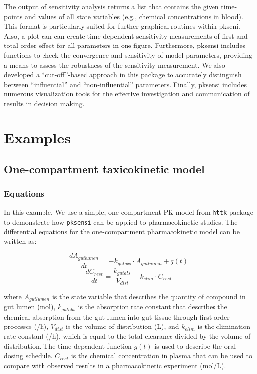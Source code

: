 \documentclass[article]{jss}
\begin{document}
The output of sensitivity analysis returns a list that contains the
given time-points and values of all state variables (e.g., chemical
concentrations in blood). This format is particularly suited for further
graphical routines within pkseni. Also, a plot can can create
time-dependent sensitivity measurements of first and total order effect
for all parameters in one figure. Furthermore, pksensi includes
functions to check the convergence and sensitivity of model parameters,
providing a means to assess the robustness of the sensitivity
measurement. We also developed a ``cut-off''-based approach in this
package to accurately distinguish between ``influential'' and
``non-influential'' parameters. Finally, pksensi includes numerous
visualization tools for the effective investigation and communication of
results in decision making.

\hypertarget{examples}{%
\section{Examples}\label{examples}}

\hypertarget{one-compartment-taxicokinetic-model}{%
\subsection{One-compartment taxicokinetic
model}\label{one-compartment-taxicokinetic-model}}

\hypertarget{equations}{%
\subsubsection{Equations}\label{equations}}

In this example, We use a simple, one-compartment PK model from
\texttt{httk} package \citep{JSSv079i04} to demonstrate how
\texttt{pksensi} can be applied to pharmacokinetic studies. The
differential equations for the one-compartment pharmacokinetic model can
be written as:

\[\frac{dA_{gutlumen}}{dt} = -k_{gutabs} \cdot A_{gutlumen} + g(t)\]
\[\frac{dC_{rest}}{dt} = \frac{k_{gutabs}}{V_{dist}}-k_{elim} \cdot C_{rest}\]

where \(A_{gutlumen}\) is the state variable that describes the quantity
of compound in gut lumen (mol), \(k_{gutabs}\) is the absorption rate
constant that describes the chemical absorption from the gut lumen into
gut tissue through first-order processes (/h), \(V_{dist}\) is the
volume of distribution (L), and \(k_{elim}\) is the elimination rate
constant (/h), which is equal to the total clearance divided by the
volume of distribution. The time-dependent function \(g(t)\) is used to
describe the oral dosing schedule. \(C_{rest}\) is the chemical
concentration in plasma that can be used to compare with observed
results in a pharmacokinetic experiment (mol/L).
\end{document}
